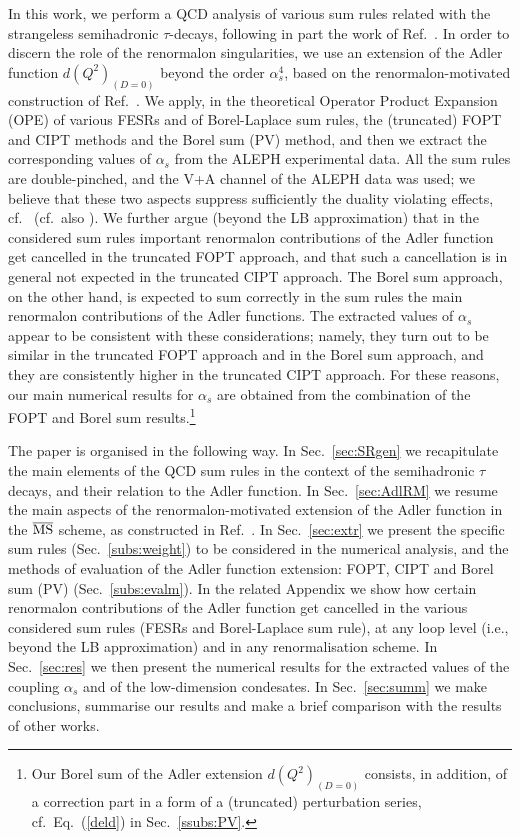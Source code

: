 \documentclass[aps,nofootinbib,showkeys,noshowpacs,preprintnumbers,amsmath,amssymb]{revtex4}
\newcommand{\MSbar}{\overline{\rm MS}}
\begin{document}
In this work, we perform a QCD analysis of various sum rules related with the strangeless semihadronic $\tau$-decays, following in part the work of Ref.~\cite{Pich}. In order to discern the role of the renormalon singularities, we use an extension of the Adler function $d(Q^2)_{(D=0)}$ beyond the  order $\alpha_s^4$, based on the renormalon-motivated construction of Ref.~\cite{renmod}. We apply, in the theoretical Operator Product Expansion (OPE) of various FESRs and of Borel-Laplace sum rules, the (truncated) FOPT and CIPT methods and the Borel sum (PV) method, and then we extract the corresponding values of $\alpha_s$ from the ALEPH experimental data.  All the sum rules are double-pinched, and the V+A channel of the ALEPH data was used; we believe that these two aspects suppress sufficiently the duality violating effects, cf.~\cite{Pich} (cf.~also \cite{BNP92,DP92,Chib,Malt,DomSch,Cir,GonzAl,Dom,RSan}). We further argue (beyond the LB approximation) that in the considered sum rules important renormalon contributions of the Adler function get cancelled in the truncated FOPT approach, and that such a cancellation is in general not expected in the truncated CIPT approach. The Borel sum approach, on the other hand, is expected to sum correctly in the sum rules the main renormalon contributions of the Adler functions. The extracted values of $\alpha_s$ appear to be consistent with these considerations; namely, they turn out to be similar in the truncated FOPT approach and in the Borel sum approach, and they are consistently higher in the truncated CIPT approach. For these reasons, our main numerical results for $\alpha_s$ are obtained from the combination of the FOPT and Borel sum results.\footnote{Our Borel sum of the Adler extension $d(Q^2)_{(D=0)}$ consists, in addition, of a correction part in a form of a (truncated) perturbation series, cf.~Eq.~(\ref{deld}) in Sec.~\ref{ssubs:PV}.} 

The paper is organised in the following way. In Sec.~\ref{sec:SRgen} we recapitulate the main elements of the QCD sum rules in the context of the semihadronic $\tau$ decays, and their relation to the Adler function. In Sec.~\ref{sec:AdlRM} we resume the main aspects of the renormalon-motivated extension of the Adler function in the $\MSbar$ scheme, as constructed in Ref.~\cite{renmod}. In Sec.~\ref{sec:extr} we present the specific sum rules (Sec.~\ref{subs:weight}) to be considered in the numerical analysis, and the methods of evaluation of the Adler function extension: FOPT, CIPT and Borel sum (PV) (Sec.~\ref{subs:evalm}). In the related Appendix we show how certain renormalon contributions of the Adler function get cancelled in the various considered sum rules (FESRs and Borel-Laplace sum rule), at any loop level (i.e., beyond the LB approximation) and in any renormalisation scheme. In Sec.~\ref{sec:res} we then present the numerical results for the extracted values of the coupling $\alpha_s$ and of the low-dimension condesates. In Sec.~\ref{sec:summ} we make conclusions, summarise our results and make a brief comparison with the results of other works.
\end{document}
